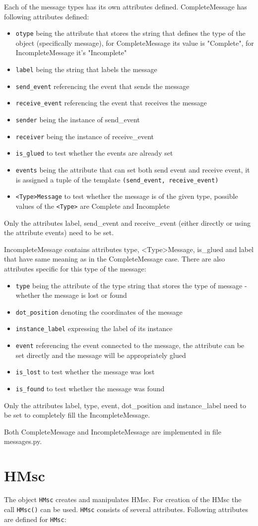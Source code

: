 \documentclass[11pt,oneside]{fithesis2}
\newcommand{\T}[1]{\texttt{#1}}
\newcommand{\ite}[1]{\item{\texttt{#1}}}
\begin{document}
Each of the message types has its own attributes defined. CompleteMessage has following attributes defined:
\begin{itemize}
\ite{otype} being the attribute that stores the string that defines the type of the object (specifically message), for CompleteMessage its value is "Complete", for IncompleteMessage it's "Incomplete"
\ite{label} being the string that labels the message
\ite{send\_event} referencing the event that sends the message
\ite{receive\_event} referencing the event that receives the message
\ite{sender} being the instance of send\_event
\ite{receiver} being the instance of receive\_event
\ite{is\_glued} to test whether the events are already set
\ite{events} being the attribute that can set both send event and receive event, it is assigned a tuple of the template \T{(send\_event, receive\_event)}
\ite{<Type>Message} to test whether the message is of the given type, possible values of the \T{<Type>} are Complete and Incomplete
\end{itemize}

Only the attributes label, send\_event and receive\_event (either directly or using the attribute events) need to be set.

IncompleteMessage contains attributes type, <Type>Message, is\_glued and label that have same meaning as in the CompleteMessage case. There are also attributes specific for this type of the message:
\begin{itemize}
\ite{type} being the attribute of the type string that stores the type of message - whether the message is lost or found
\ite{dot\_position} denoting the coordinates of the message
\ite{instance\_label} expressing the label of its instance
\ite{event} referencing the event connected to the message, the attribute can be set directly and the message will be appropriately glued
\ite{is\_lost} to test whether the message was lost
\ite{is\_found} to test whether the message was found
\end{itemize}

Only the attributes label, type, event, dot\_position and instance\_label need to be set to completely fill the IncompleteMessage.

Both CompleteMessage and IncompleteMessage are implemented in file messages.py.


\section{HMsc}
The object \T{HMsc} creates and manipulates HMsc. For creation of the HMsc the call \T{HMsc()} can be used. \T{HMsc} consists of several attributes. Following attributes are defined for \T{HMsc}:
\end{document}

